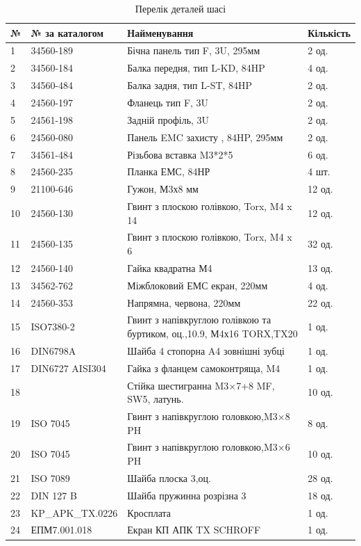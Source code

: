 \begin{table}[H]
    \centering
  \caption{Перелік деталей шасі}
    \begin{tabular}{|p{0.8cm}|p{3.2cm}|p{7.5cm}|p{2cm}|} 
        \hline
        \textbf{№} & \textbf{№ за каталогом} & \textbf{Найменування} & \textbf{Кількість} \\ \hline
        1 & 34560-189 & Бічна панель тип F, 3U, 295мм  & 2 од. \\ \hline
        2 & 34560-184 & Балка передня, тип L-KD, 84HP & 4 од. \\ \hline
        3 & 34560-484 & Балка задня, тип L-ST, 84HP & 2 од. \\ \hline
        4 & 24560-197 & Фланець тип F, 3U & 2 од. \\ \hline
        5 & 24561-198 & Задній профіль, 3U & 2 од. \\ \hline
        6 & 24560-080 & Панель EMC захисту , 84HP, 295мм & 2 од. \\ \hline
        7 & 34561-484 & Різьбова вставка M3*2*5 & 6 од. \\ \hline
        8 & 24560-235 & Планка ЕМС, 84НР & 4 шт. \\ \hline
        9 & 21100-646 & Гужон, М3х8 мм & 12 од. \\ \hline
       10 & 24560-130 & Гвинт з плоскою голівкою, Torx, M4 x 14 & 12 од. \\ \hline
       11 & 24560-135 & Гвинт з плоскою голівкою, Torx, M4 x 6 & 32 од. \\ \hline
       12 & 24560-140 & Гайка квадратна М4 & 13 од. \\ \hline
       13 & 34562-762 & Міжблоковий ЕМС екран, 220мм & 4 од. \\ \hline
       14 & 24560-353 & Напрямна, червона, 220мм & 22 од. \\ \hline
       15 & ISO7380-2 & Гвинт з напівкруглою голівкою та буртиком, оц.,10.9, М4х16 TORX,TX20 & 1 од. \\ \hline
       16 & DIN6798A & Шайба 4 стопорна A4 зовнішні зубці & 1 од. \\ \hline
       17 & DIN6727 AISI304 & Гайка з фланцем самоконтряща, M4 & 1 од. \\ \hline
       18 &  & Стійка шестигранна M3×7+8 MF, SW5, латунь. & 10 од. \\ \hline
       19 & ISO 7045 & Гвинт з напівкруглою головкою,M3×8 PH & 8 од. \\ \hline
       20 & ISO 7045 & Гвинт з напівкруглою головкою,M3×6 PH & 10 од. \\ \hline
       21 & ISO 7089 & Шайба плоска 3,оц. & 28 од. \\ \hline
       22 & DIN 127 B & Шайба пружинна розрізна 3 & 18 од. \\ \hline
       23 & KP_APK_TX.0226 & Кросплата & 1 од. \\ \hline
       24 & ЕПМ7.001.018 & Екран КП АПК TX SCHROFF & 1 од. \\ \hline
   
    \end{tabular}
    
\end{table}

